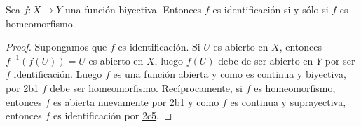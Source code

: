 
\begin{proposition}
Sea $f : X \longrightarrow Y$ una función biyectiva. Entonces $f$ es identificación si y sólo si $f$ es homeomorfismo.
\end{proposition}

\begin{proof}
Supongamos que $f$ es identificación. Si $U$ es abierto en $X$, entonces $f^{-1}(f(U)) = U$ es abierto en $X$, luego $f(U)$ debe de ser abierto en $Y$ por ser $f$ identificación. Luego $f$ es una función abierta y como es continua y biyectiva, por \hyperref[card:2b1]{\textsf{2b1}} $f$ debe ser homeomorfismo. Recíprocamente, si $f$ es homeomorfismo, entonces $f$ es abierta nuevamente por \hyperref[card:2b1]{\textsf{2b1}} y como $f$ es continua y suprayectiva, entonces $f$ es identificación por \hyperref[card:2c5]{\textsf{2c5}}.
\end{proof}
